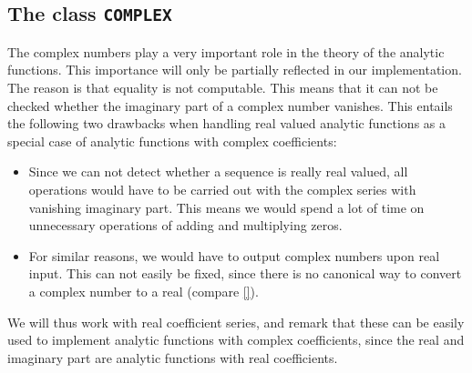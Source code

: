 \documentclass{article}
\newcommand{\ir}[1]{\texttt{#1}}
\begin{document}
\subsection{The class \ir{COMPLEX}}\label{sec: The class COMPLEX}

The complex numbers play a very important role in the theory of the analytic functions. This importance will only be partially reflected in our implementation. The reason is that equality is not computable. This means that it can not be checked whether the imaginary part of a complex number vanishes. This entails the following two drawbacks when handling real valued analytic functions as a special case of analytic functions with complex coefficients:
\begin{itemize}
\item Since we can not detect whether a sequence is really real valued, all operations would have to be carried out with the complex series with vanishing imaginary part. This means we would spend a lot of time on unnecessary operations of adding and multiplying zeros.
\item For similar reasons, we would have to output complex numbers upon real input. This can not easily be fixed, since there is no canonical way to convert a complex number to a real (compare \cref{}).
\end{itemize}
We will thus work with real coefficient series, and remark that these can be easily used to implement analytic functions with complex coefficients, since the real and imaginary part are analytic functions with real coefficients.
\end{document}
